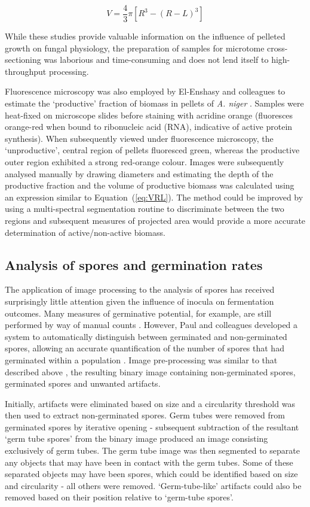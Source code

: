 \begin{equation}\label{eq:VRL}
	V = \frac{4}{3} \pi [R^3 - (R - L)^3]
\end{equation}

\noindent While these studies provide valuable information on the influence of pelleted growth on fungal physiology, the preparation of samples for microtome cross-sectioning was laborious and time-consuming and does not lend itself to high-throughput processing.

Fluorescence microscopy was also employed by El-Enshasy and colleagues to estimate the \lq productive' fraction of biomass in pellets of \emph{A. niger} \cite{elenshasy2006}. Samples were heat-fixed on microscope slides before staining with acridine orange (fluoresces orange-red when bound to ribonucleic acid  (RNA), indicative of active protein synthesis). When subsequently viewed under fluorescence microscopy, the \lq unproductive', central region of pellets fluoresced green, whereas the productive outer region exhibited a strong red-orange colour. Images were subsequently analysed manually by drawing diameters and estimating the depth of the productive fraction and the volume of productive biomass was calculated using an expression similar to Equation~(\ref{eq:VRL}). The method could be improved by using a multi-spectral segmentation routine to discriminate between the two regions and subsequent measures of projected area would provide a more accurate determination of active/non-active biomass.

\subsection{Analysis of spores and germination rates}

The application of image processing to the analysis of spores has received surprisingly little attention given the influence of inocula on fermentation outcomes. Many measures of germinative potential, for example, are still performed by way of manual counts \cite{sautour2001,pardo2005}. However, Paul and colleagues developed a system to automatically distinguish between germinated and non-germinated spores, allowing an accurate quantification of the number of spores that had germinated within a population \cite{paul1993}. Image pre-processing was similar to that described above \cite{paul1999}, the resulting binary image containing non-germinated spores, germinated spores and unwanted artifacts.

Initially, artifacts were eliminated based on size and a circularity threshold was then used to extract non-germinated spores. Germ tubes were removed from germinated spores by iterative opening - subsequent subtraction of the resultant \lq germ tube spores' from the binary image produced an image consisting exclusively of germ tubes. The germ tube image was then segmented to separate any objects that may have been in contact with the germ tubes. Some of these separated objects may have been spores, which could be identified based on size and circularity - all others were removed. \lq Germ-tube-like' artifacts could also be removed based on their position relative to \lq germ-tube spores'.

